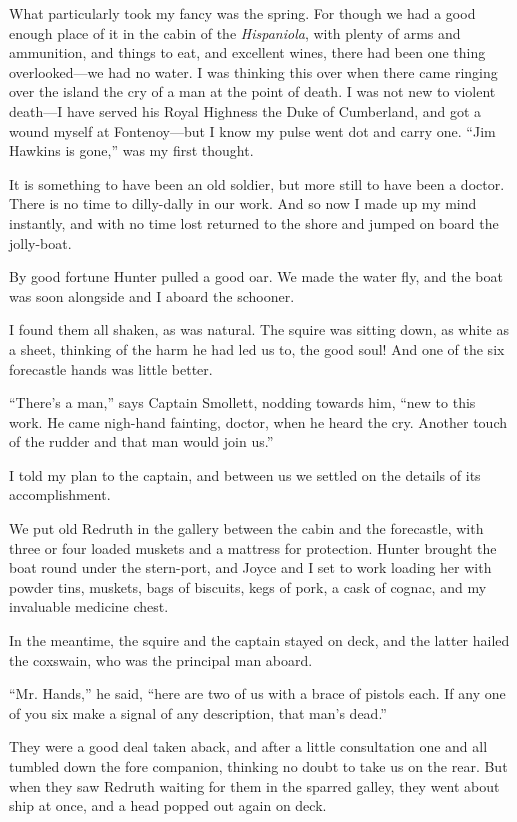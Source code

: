 What particularly took my fancy was the spring. For though we had a good enough place of it in the cabin of the \textit{Hispaniola}, with plenty of arms and ammunition, and things to eat, and excellent wines, there had been one thing overlooked---we had no water. I was thinking this over when there came ringing over the island the cry of a man at the point of death. I was not new to violent death---I have served his Royal Highness the Duke of Cumberland, and got a wound myself at Fontenoy---but I know my pulse went dot and carry one. \enquote{Jim Hawkins is gone,} was my first thought.

It is something to have been an old soldier, but more still to have been a doctor. There is no time to dilly-dally in our work. And so now I made up my mind instantly, and with no time lost returned to the shore and jumped on board the jolly-boat.

By good fortune Hunter pulled a good oar. We made the water fly, and the boat was soon alongside and I aboard the schooner.

I found them all shaken, as was natural. The squire was sitting down, as white as a sheet, thinking of the harm he had led us to, the good soul! And one of the six forecastle hands was little better.

\enquote{There’s a man,} says Captain Smollett, nodding towards him, \enquote{new to this work. He came nigh-hand fainting, doctor, when he heard the cry. Another touch of the rudder and that man would join us.}

I told my plan to the captain, and between us we settled on the details of its accomplishment.

We put old Redruth in the gallery between the cabin and the forecastle, with three or four loaded muskets and a mattress for protection. Hunter brought the boat round under the stern-port, and Joyce and I set to work loading her with powder tins, muskets, bags of biscuits, kegs of pork, a cask of cognac, and my invaluable medicine chest.

In the meantime, the squire and the captain stayed on deck, and the latter hailed the coxswain, who was the principal man aboard.

\enquote{Mr. Hands,} he said, \enquote{here are two of us with a brace of pistols each. If any one of you six make a signal of any description, that man’s dead.}

They were a good deal taken aback, and after a little consultation one and all tumbled down the fore companion, thinking no doubt to take us on the rear. But when they saw Redruth waiting for them in the sparred galley, they went about ship at once, and a head popped out again on deck.

